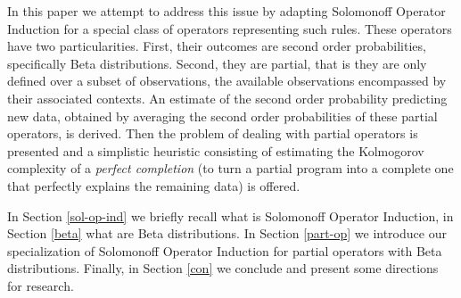 \documentclass[runningheads]{llncs}
\begin{document}

In this paper we attempt to address this issue by adapting Solomonoff
Operator Induction \cite{Solomonoff08Three} for a special class of
operators representing such rules. These operators have two
particularities. First, their outcomes are second order probabilities,
specifically Beta distributions. Second, they are partial, that is
they are only defined over a subset of observations, the available
observations encompassed by their associated contexts. An estimate of
the second order probability predicting new data, obtained by
averaging the second order probabilities of these partial operators,
is derived. Then the problem of dealing with partial operators is
presented and a simplistic heuristic consisting of estimating the
Kolmogorov complexity of a \emph{perfect completion} (to turn a
partial program into a complete one that perfectly explains the
remaining data) is offered.



In Section \ref{sol-op-ind} we briefly recall what is Solomonoff
Operator Induction, in Section \ref{beta} what are Beta
distributions. In Section \ref{part-op} we introduce our
specialization of Solomonoff Operator Induction for partial operators
with Beta distributions. Finally, in Section \ref{con} we conclude and
present some directions for research.

\end{document}
